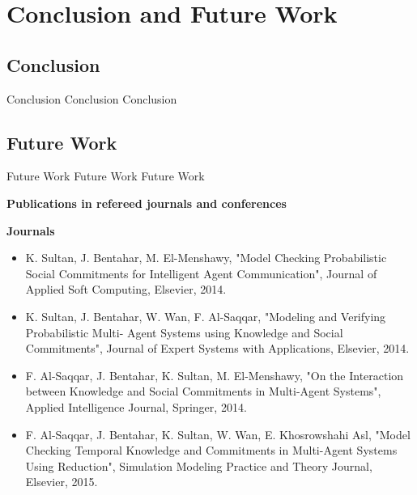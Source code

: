 \chapter{Conclusion and Future Work}\label{Chap5:Conclusion}

\section{Conclusion}

Conclusion Conclusion Conclusion
\section{Future Work}

Future Work Future Work Future Work

\newpage
\textbf{Publications in refereed journals and conferences}

\textbf{Journals}

\begin{itemize}
\item K. Sultan, J. Bentahar, M. El-Menshawy, "Model Checking Probabilistic Social Commitments for Intelligent Agent Communication", Journal of Applied Soft Computing, Elsevier, 2014.

\item K. Sultan, J. Bentahar, W. Wan, F. Al-Saqqar, "Modeling and Verifying Probabilistic Multi-  Agent Systems using Knowledge and Social Commitments", Journal of Expert Systems with Applications, Elsevier, 2014.

\item F. Al-Saqqar, J. Bentahar, K. Sultan, M. El-Menshawy, "On the Interaction between Knowledge and Social Commitments in Multi-Agent Systems", Applied Intelligence Journal, Springer, 2014.

\item F. Al-Saqqar, J. Bentahar, K. Sultan, W. Wan, E. Khosrowshahi
Asl, "Model Checking Temporal Knowledge and Commitments in Multi-Agent Systems Using Reduction", Simulation Modeling Practice and Theory Journal, Elsevier, 2015.
\end{itemize}

